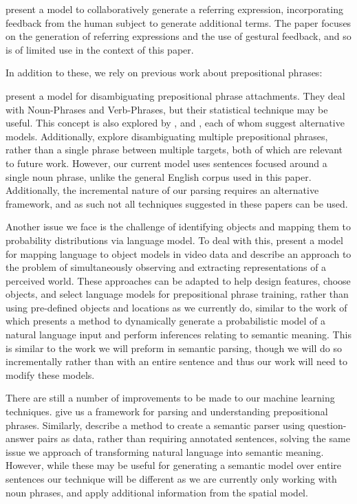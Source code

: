 \documentclass[conference]{IEEEtran}
\numberwithin{equation}{section}
\begin{document}
\citet{fang2015embodied} present a model to collaboratively generate a referring expression, incorporating feedback from the human subject to generate additional terms. The paper focuses on the generation of referring expressions and the use of gestural feedback, and so is of limited use in the context of this paper.

In addition to these, we rely on previous work about prepositional phrases:

\citet{collins95} present a model for disambiguating prepositional phrase attachments. They deal with Noun-Phrases and Verb-Phrases, but their statistical technique may be useful. This concept is also explored by \citet{ratna98}, and \citet{brill94}, each of whom suggest alternative models. Additionally, \citet{merlo97} explore disambiguating multiple prepositional phrases, rather than a single phrase between multiple targets, both of which are relevant to future work. However, our current model uses sentences focused around a single noun phrase, unlike the general English corpus used in this paper. Additionally, the incremental nature of our parsing requires an alternative framework, and as such not all techniques suggested in these papers can be used.

Another issue we face is the challenge of identifying objects and mapping them to probability distributions via language model. To deal with this, \citet{barbu13} present a model for mapping language to object models in video data and \citet{UW_RSE_ICML2012} describe an approach to the problem of simultaneously observing and extracting representations of a perceived world. These approaches can be adapted to help design features, choose objects, and select language models for prepositional phrase training, rather than using pre-defined objects and locations as we currently do, similar to the work of \citet{tellex2011understanding} which presents a method to dynamically generate a probabilistic model of a natural language input and perform inferences relating to semantic meaning. This is similar to the work we will preform in semantic parsing, though we will do so incrementally rather than with an entire sentence and thus our work will need to modify these models.

There are still a number of improvements to be made to our machine learning techniques. \citet{rudzicz03} give us a framework for parsing and understanding prepositional phrases. Similarly, \citet{liang2013learning} describe a method to create a semantic parser using question-answer pairs as data, rather than requiring annotated sentences, solving the same issue we approach of transforming natural language into semantic meaning. However, while these may be useful for generating a semantic model over entire sentences our technique will be different as we are currently only working with noun phrases, and apply additional information from the spatial model. 
\end{document}
